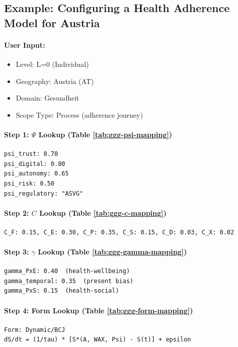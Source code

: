 \subsection{Example: Configuring a Health Adherence Model for Austria}

\paragraph{User Input:}
\begin{itemize}
\item Level: L=0 (Individual)
\item Geography: Austria (AT)
\item Domain: Gesundheit
\item Scope Type: Process (adherence journey)
\end{itemize}

\paragraph{Step 1: $\Psi$ Lookup (Table \ref{tab:ggg-psi-mapping})}
\begin{verbatim}
psi_trust: 0.70
psi_digital: 0.80
psi_autonomy: 0.65
psi_risk: 0.50
psi_regulatory: "ASVG"
\end{verbatim}

\paragraph{Step 2: $C$ Lookup (Table \ref{tab:ggg-c-mapping})}
\begin{verbatim}
C_F: 0.15, C_E: 0.30, C_P: 0.35, C_S: 0.15, C_D: 0.03, C_X: 0.02
\end{verbatim}

\paragraph{Step 3: $\gamma$ Lookup (Table \ref{tab:ggg-gamma-mapping})}
\begin{verbatim}
gamma_PxE: 0.40  (health-wellbeing)
gamma_temporal: 0.35  (present bias)
gamma_PxS: 0.15  (health-social)
\end{verbatim}

\paragraph{Step 4: Form Lookup (Table \ref{tab:ggg-form-mapping})}
\begin{verbatim}
Form: Dynamic/BCJ
dS/dt = (1/tau) * [S*(A, WAX, Psi) - S(t)] + epsilon
\end{verbatim}

